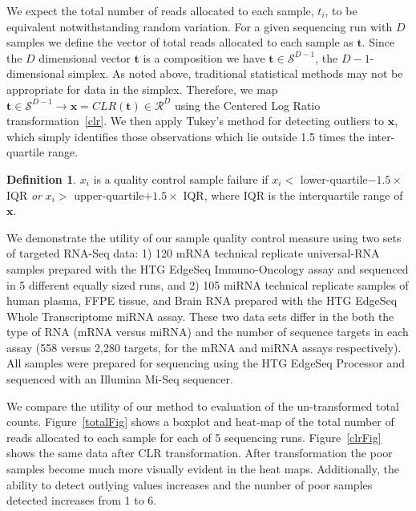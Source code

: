 \documentclass [10pt]{article}
\theoremstyle{definition}
\newtheorem{definition}{Definition}
\begin{document}
We expect the total number of reads allocated to each sample, $t_i$, to be equivalent notwithstanding random variation. For a given sequencing run with $D$ samples we define the vector of total reads allocated to each sample as $\mathbf{t}$.  Since the $D$ dimensional vector $\mathbf{t}$ is a composition we have $\mathbf{t} \in \mathcal{S}^{D-1}$, the $D-1$-dimensional simplex. As noted above, traditional statistical methods may not be appropriate for data in the simplex.  Therefore, we map $\mathbf{t} \in \mathcal{S}^{D-1} \rightarrow \mathbf{x} = CLR(\mathbf{t}) \in \mathcal{R}^D$ using the Centered Log Ratio transformation~\ref{clr}.  We then apply Tukey's method for detecting outliers to $\mathbf{x}$, which simply identifies those observations which lie outside 1.5 times the inter-quartile range.

\theoremstyle{definition}
\begin{definition}
$x_i$ is a quality control sample failure if $x_i <$ lower-quartile$- 1.5 \times$ IQR \emph{or}  $x_i >$ upper-quartile$+ 1.5 \times$ IQR, where IQR is the interquartile range of $\mathbf{x}$.
\end{definition}

We demonstrate the utility of our sample quality control measure using two sets of targeted RNA-Seq data: 1) 120 mRNA technical replicate universal-RNA samples prepared with the HTG EdgeSeq Immuno-Oncology assay and sequenced in 5 different equally sized runs, and 2) 105 miRNA technical replicate samples of human plasma, FFPE tissue, and Brain RNA prepared with the HTG EdgeSeq Whole Transcriptome miRNA assay.  These two data sets differ in the both the type of RNA (mRNA versus miRNA) and the number of sequence targets in each assay (558 versus 2,280 targets, for the mRNA and miRNA assays respectively).  All samples were prepared for sequencing using the HTG EdgeSeq Processor and sequenced with an Illumina Mi-Seq sequencer.

We compare the utility of our method to evaluation of the un-transformed total counts.  Figure~\ref{totalFig} shows a boxplot and heat-map of the total number of reads allocated to each sample for each of 5 sequencing runs.  Figure~\ref{clrFig} shows the same data after CLR transformation.  After transformation the poor samples become much more visually evident in the heat maps.  Additionally, the ability to detect outlying values increases and the number of poor samples detected increases from 1 to 6.  
\end{document}
